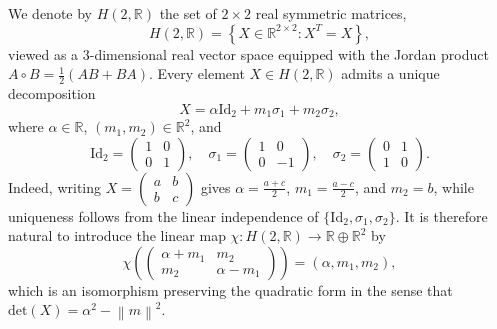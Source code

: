 \documentclass[11pt]{article}
\theoremstyle{plain}
\theoremstyle{definition}
\theoremstyle{remark}
\newcommand{\R}{\mathbb{R}}
\newcommand{\norm}[1]{\left\lVert #1 \right\rVert}
\newcommand{\Det}{\mathrm{det}}
\newcommand{\Id}{\mathrm{Id}}
\begin{document}
We denote by $H(2,\R)$ the set of $2 \times 2$ real symmetric matrices,
\begin{equation}
H(2,\R) = \left\{ X \in \R^{2\times 2} : X^T = X \right\},
\end{equation}
viewed as a $3$-dimensional real vector space equipped with the Jordan product $A \circ B = \frac{1}{2}(AB + BA)$. Every element $X \in H(2,\R)$ admits a unique decomposition
\begin{equation}
X = \alpha \Id_2 + m_1 \sigma_1 + m_2 \sigma_2,
\end{equation}
where $\alpha \in \R$, $(m_1, m_2) \in \R^2$, and
\begin{equation}
\Id_2 = \begin{pmatrix} 1 & 0 \\ 0 & 1 \end{pmatrix}, \quad
\sigma_1 = \begin{pmatrix} 1 & 0 \\ 0 & -1 \end{pmatrix}, \quad
\sigma_2 = \begin{pmatrix} 0 & 1 \\ 1 & 0 \end{pmatrix}.
\end{equation}
Indeed, writing $X = \begin{pmatrix} a & b \\ b & c \end{pmatrix}$ gives $\alpha = \frac{a+c}{2}$, $m_1 = \frac{a-c}{2}$, and $m_2 = b$, while uniqueness follows from the linear independence of $\{\Id_2, \sigma_1, \sigma_2\}$. It is therefore natural to introduce the linear map $\chi: H(2,\R) \to \R \oplus \R^2$ by
\begin{equation}
\chi\left( \begin{pmatrix} \alpha + m_1 & m_2 \\ m_2 & \alpha - m_1 \end{pmatrix} \right) = (\alpha, m_1, m_2),
\end{equation}
which is an isomorphism preserving the quadratic form in the sense that $\Det(X) = \alpha^2 - \norm{m}^2$.
\end{document}
